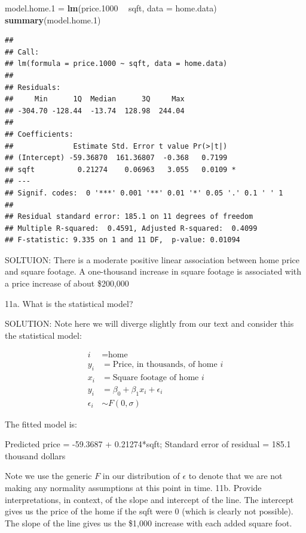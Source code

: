 \documentclass[]{article}
\newenvironment{Shaded}{\begin{snugshade}}{\end{snugshade}}
\newcommand{\KeywordTok}[1]{\textcolor[rgb]{0.13,0.29,0.53}{\textbf{#1}}}
\newcommand{\DataTypeTok}[1]{\textcolor[rgb]{0.13,0.29,0.53}{#1}}
\newcommand{\DecValTok}[1]{\textcolor[rgb]{0.00,0.00,0.81}{#1}}
\newcommand{\StringTok}[1]{\textcolor[rgb]{0.31,0.60,0.02}{#1}}
\newcommand{\OperatorTok}[1]{\textcolor[rgb]{0.81,0.36,0.00}{\textbf{#1}}}
\newcommand{\NormalTok}[1]{#1}
\begin{document}
\begin{Shaded}
\begin{Highlighting}[]
\NormalTok{model.home.}\DecValTok{1}\NormalTok{ =}\StringTok{ }\KeywordTok{lm}\NormalTok{(price.}\DecValTok{1000} \OperatorTok{~}\StringTok{ }\NormalTok{sqft, }\DataTypeTok{data =}\NormalTok{ home.data)}
\KeywordTok{summary}\NormalTok{(model.home.}\DecValTok{1}\NormalTok{)}
\end{Highlighting}
\end{Shaded}

\begin{verbatim}
## 
## Call:
## lm(formula = price.1000 ~ sqft, data = home.data)
## 
## Residuals:
##     Min      1Q  Median      3Q     Max 
## -304.70 -128.44  -13.74  128.98  244.04 
## 
## Coefficients:
##              Estimate Std. Error t value Pr(>|t|)  
## (Intercept) -59.36870  161.36807  -0.368   0.7199  
## sqft          0.21274    0.06963   3.055   0.0109 *
## ---
## Signif. codes:  0 '***' 0.001 '**' 0.01 '*' 0.05 '.' 0.1 ' ' 1
## 
## Residual standard error: 185.1 on 11 degrees of freedom
## Multiple R-squared:  0.4591, Adjusted R-squared:  0.4099 
## F-statistic: 9.335 on 1 and 11 DF,  p-value: 0.01094
\end{verbatim}

SOLTUION: There is a moderate positive linear association between home
price and square footage. A one-thousand increase in square footage is
associated with a price increase of about \$200,000

11a. What is the statistical model?

SOLUTION: Note here we will diverge slightly from our text and consider
this the statistical model:

\begin{align*}
i&=\mbox{home}\\
y_i & = \mbox{Price, in thousands, of home }i\\
x_i &= \mbox{Square footage of home }i\\
y_i &= \beta_0 + \beta_1 x_i + \epsilon_i\\
\epsilon_i &\sim F(0,\sigma)
\end{align*}

The fitted model is:

Predicted price = -59.3687 + 0.21274*sqft; Standard error of residual =
185.1 thousand dollars

Note we use the generic \(F\) in our distribution of \(\epsilon\) to
denote that we are not making any normality assumptions at this point in
time. 11b. Provide interpretations, in context, of the slope and
intercept of the line. The intercept gives us the price of the home if
the sqft were 0 (which is clearly not possible). The slope of the line
gives us the \$1,000 increase with each added square foot.
\end{document}
